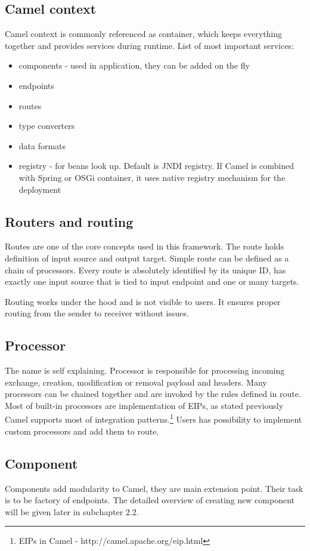 \documentclass[12pt,final,oneside]{fithesis2}
\begin{document}
  


\subsection*{Camel context}
Camel context is commonly referenced as container, which keeps everything together and provides services during runtime. List of most important services:
\begin{itemize}
\item components - used in application, they can be added on the fly 
\item endpoints
\item routes
\item type converters
\item data formats
\item registry - for beans look up. Default is JNDI registry. If Camel is combined with Spring or OSGi container, it uses native registry mechanism for the deployment
\end{itemize}

\subsection*{Routers and routing}
Routes are one of the core concepts used in this framework. The route holds definition of input source and output target. Simple route can be defined as a chain of processors. Every route is absolutely identified by its unique ID, has exactly one input source that is tied to input endpoint and one or many targets.

Routing works under the hood and is not visible to users. It ensures proper routing from the sender to receiver without issues.

\subsection*{Processor}
The name is self explaining. Processor is responsible for processing incoming exchange, creation, modification or removal payload and headers. Many processors can be chained together and are invoked by the rules defined in route. Most of built-in processors are implementation of EIPs, as stated previously Camel supports most of integration patterns.\footnote{EIPs in Camel - http://camel.apache.org/eip.html} Users has possibility to implement custom processors and add them to route.   

\subsection*{Component}
Components add modularity to Camel, they are main extension point. Their task is to be factory of endpoints. The detailed overview of creating new component will be given later in subchapter 2.2. 
\end{document}
